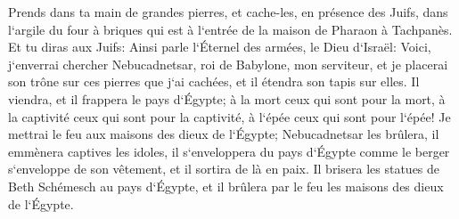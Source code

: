 \verse Prends dans ta main de grandes pierres, et cache-les, en présence des Juifs, dans l`argile du four à briques qui est à l`entrée de la maison de Pharaon à Tachpanès. 
\verse Et tu diras aux Juifs: Ainsi parle l`Éternel des armées, le Dieu d`Israël: Voici, j`enverrai chercher Nebucadnetsar, roi de Babylone, mon serviteur, et je placerai son trône sur ces pierres que j`ai cachées, et il étendra son tapis sur elles. 
\verse Il viendra, et il frappera le pays d`Égypte; à la mort ceux qui sont pour la mort, à la captivité ceux qui sont pour la captivité, à l`épée ceux qui sont pour l`épée! 
\verse Je mettrai le feu aux maisons des dieux de l`Égypte; Nebucadnetsar les brûlera, il emmènera captives les idoles, il s`enveloppera du pays d`Égypte comme le berger s`enveloppe de son vêtement, et il sortira de là en paix. 
\verse Il brisera les statues de Beth Schémesch au pays d`Égypte, et il brûlera par le feu les maisons des dieux de l`Égypte. 

\chapter{}

